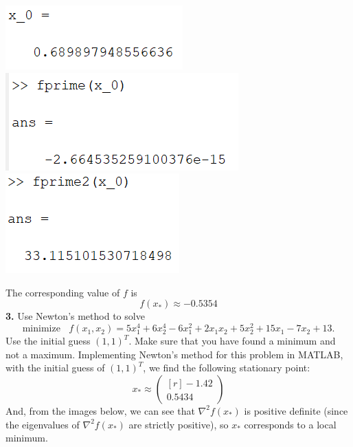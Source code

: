 \documentclass{article}
\begin{document}
\begin{center}
    \includegraphics[scale = 0.9]{initGuess_1}
    \includegraphics[scale = 0.9]{fprime_init_1}
    \includegraphics[scale = 0.9]{fprime2_1}
    \newline\newline\newline
\end{center}
The corresponding value of $f$ is 
\[f(x_*) \approx -0.5354\]
\newline\newline\newline
\textbf{3.} Use Newton's method to solve
\[\text{minimize}\:\:\:\: f(x_1,x_2) = 5x_1^4 + 6x_2^4 - 6x_1^2 + 2x_1x_2 + 5x_2^2 + 15x_1 - 7x_2 + 13.\]
Use the initial guess $(1,1)^T$. Make sure that you have found a minimum and not a maximum.
\newline\newline
Implementing Newton's method for this problem in MATLAB, with the initial guess of $(1,1)^T$, we find the following stationary point:
\newline
\[x_* \approx \begin{pmatrix*}[r]
    -1.42\\
    0.5434
\end{pmatrix*}\]
\newline
And, from the images below, we can see that $\nabla^2f(x_*)$ is positive definite (since the eigenvalues of $\nabla^2f(x_*)$ are strictly positive), so $x_*$ corresponds to a local minimum.
\end{document}
